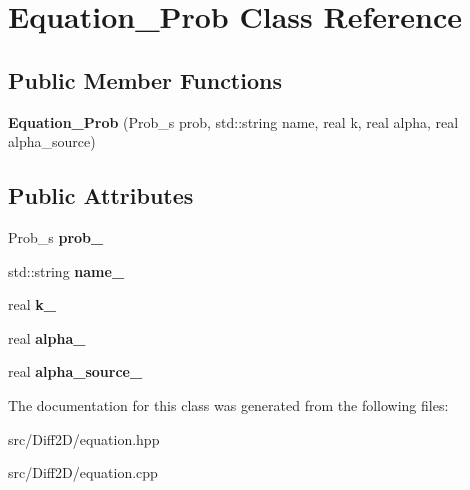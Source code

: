 \hypertarget{classEquation__Prob}{\section{Equation\-\_\-\-Prob Class Reference}
\label{classEquation__Prob}
}
\subsection*{Public Member Functions}
\begin{DoxyCompactItemize}
\item 
\hypertarget{classEquation__Prob_a8eda60c6fe1e289ac5384cdf530cb47b}{{\bfseries Equation\-\_\-\-Prob} (Prob\-\_\-s prob, std\-::string name, real k, real alpha, real alpha\-\_\-source)}\label{classEquation__Prob_a8eda60c6fe1e289ac5384cdf530cb47b}

\end{DoxyCompactItemize}
\subsection*{Public Attributes}
\begin{DoxyCompactItemize}
\item 
\hypertarget{classEquation__Prob_a8761e4cfb7c9c934d1827a91625d7643}{Prob\-\_\-s {\bfseries prob\-\_\-}}\label{classEquation__Prob_a8761e4cfb7c9c934d1827a91625d7643}

\item 
\hypertarget{classEquation__Prob_af9c78d17a5b69f44175e95cef57c05d3}{std\-::string {\bfseries name\-\_\-}}\label{classEquation__Prob_af9c78d17a5b69f44175e95cef57c05d3}

\item 
\hypertarget{classEquation__Prob_add8db541a0ff4a402b95e2a70a3ad7a8}{real {\bfseries k\-\_\-}}\label{classEquation__Prob_add8db541a0ff4a402b95e2a70a3ad7a8}

\item 
\hypertarget{classEquation__Prob_ab8c2b9f46d6d9393c6556d0e734aae61}{real {\bfseries alpha\-\_\-}}\label{classEquation__Prob_ab8c2b9f46d6d9393c6556d0e734aae61}

\item 
\hypertarget{classEquation__Prob_aeb3f0d6aa0ffbbd16bc0866f177ec13e}{real {\bfseries alpha\-\_\-source\-\_\-}}\label{classEquation__Prob_aeb3f0d6aa0ffbbd16bc0866f177ec13e}

\end{DoxyCompactItemize}


The documentation for this class was generated from the following files\-:\begin{DoxyCompactItemize}
\item 
src/\-Diff2\-D/equation.\-hpp\item 
src/\-Diff2\-D/equation.\-cpp\end{DoxyCompactItemize}
